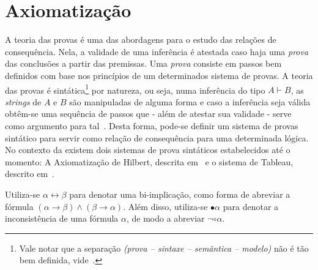 \section{Axiomatização}
\label{sec:axiomatizacao}
A teoria das provas é uma das abordagens para o estudo das relações de consequência. Nela, a validade de uma inferência é atestada caso haja uma \textit{prova} das conclusões a partir das premissas. Uma \textit{prova} consiste em passos bem definidos com base nos princípios de um determinados sistema de provas. A teoria das provas é sintática\footnote{Vale notar que a separação \textit{(prova {--} sintaxe {--} semântica {--} modelo)} não é tão bem definida, vide~.} por natureza, ou seja, numa inferência do tipo $A \vdash B$, as \textit{strings} de $A$ e $B$ são manipuladas de alguma forma e caso a inferência seja válida obtêm-se uma sequência de passos que {-} além de atestar sua validade {-} serve como argumento para tal~\cite{sep-logical-consequence}. Desta forma, pode-se definir um sistema de provas sintático para servir como relação de consequência para uma determinada lógica. No contexto da \lfium{} existem dois sistemas de prova sintáticos estabelecidos até o momento: A Axiomatização de Hilbert, descrita em~\cite{carnielli2000formal, Carnielli_Coniglio_2016} e o sistema de Tableau, descrito em~\cite{tableaulfi}.



\begin{notacao}
    Utiliza-se $\alpha \leftrightarrow \beta$ para denotar uma bi-implicação, como forma de abreviar a fórmula $(\alpha \rightarrow \beta) \land (\beta \rightarrow \alpha)$. Além disso, utiliza-se $\bullet \alpha$ para denotar a inconsistência de uma fórmula $\alpha$, de modo a abreviar $\neg \circ \alpha$.
\end{notacao}

